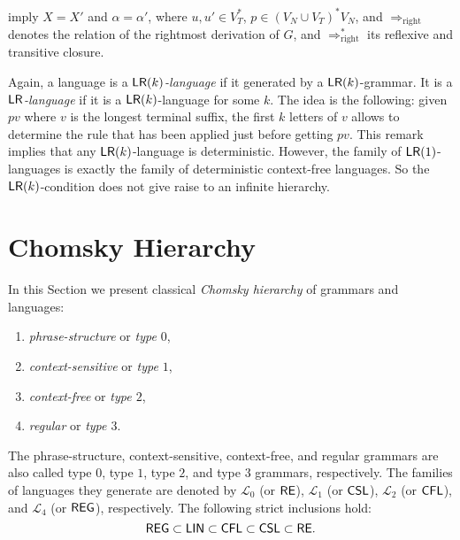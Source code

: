 \noindent imply $X = X'$ and $\alpha = \alpha'$, where $u, u' \in V_T^*$, $p \in (V_N \cup V_T)^* V_N$, and $\Rightarrow_{\text{right}}$ denotes the relation of the rightmost derivation of $G$, and $\Rightarrow^*_{\text{right}}$ its reflexive and transitive closure.

Again, a language is a \emph{$\textup{\sf LR}(k)$-language} if it generated by a $\textup{\sf LR}(k)$-grammar. It is a \emph{$\textup{\sf LR}$-language} if it is a $\textup{\sf LR}(k)$-language for some $k$. The idea is the following: given $pv$ where $v$ is the longest terminal suffix, the first $k$ letters of $v$ allows to determine the rule that has been applied just before getting $pv$. This remark implies that any $\textup{\sf LR}(k)$-language is deterministic. However, the family of $\textup{\sf LR}(1)$-languages is exactly the family of deterministic context-free languages. So the $\textup{\sf LR}(k)$-condition does not give raise to an infinite hierarchy.

\section{Chomsky Hierarchy}
\label{section:chomsky-hierarchy}

In this Section we present classical \emph{Chomsky hierarchy} of grammars and languages:

\begin{enumerate}
\item {}\emph{phrase-structure} or \emph{type $0$},
\item {}\emph{context-sensitive} or \emph{type $1$},
\item {}\emph{context-free} or \emph{type $2$},
\item {}\emph{regular} or \emph{type $3$}.
\end{enumerate}

The phrase-structure, context-sensitive, context-free, and regular grammars are also called type $0$, type $1$, type $2$, and type $3$ grammars, respectively. The families of languages they generate are denoted by
$\mathcal{L}_0$ (or \index{$\RE$}$\RE$),
$\mathcal{L}_1$ (or \index{$\CSL$}$\CSL$),
$\mathcal{L}_2$ (or \index{$\CFL$}$\CFL$), and
$\mathcal{L}_4$ (or \index{$\Reg$}$\Reg$), respectively.
The following strict inclusions hold:
$$\textup{\sf REG} \subset \textup{\sf LIN} \subset \textup{\sf CFL} \subset \textup{\sf CSL} \subset \textup{\sf RE}.$$

